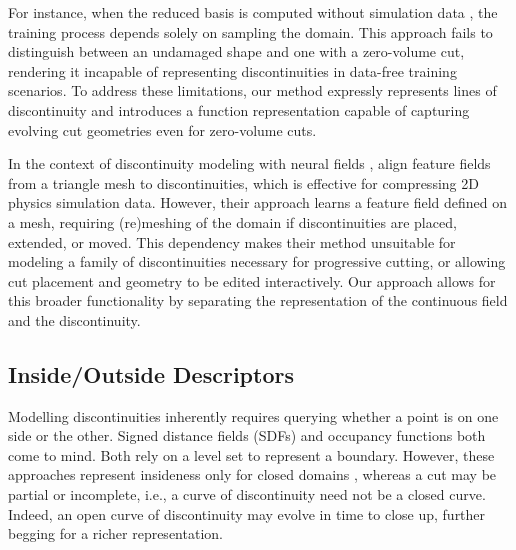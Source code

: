 For instance, when the reduced basis is computed without simulation data \citep{Modi:2024:Simplicits}, the training process depends solely on sampling the domain. This approach fails to distinguish between an undamaged shape and one with a zero-volume cut, rendering it incapable of representing discontinuities in data-free training scenarios. To address these limitations, our method expressly represents lines of discontinuity and introduces a function representation capable of capturing evolving cut geometries even for zero-volume cuts.

In the context of discontinuity modeling with neural fields \cite{liu20242d}, \citet{Belhe:2023:DiscontinuityAwareNeuralFields} align feature fields from a triangle mesh to discontinuities, which is effective for compressing 2D physics simulation data. However, their approach learns a feature field defined on a mesh, requiring (re)meshing of the domain if discontinuities are placed, extended, or moved. This dependency makes their method unsuitable for modeling a family of discontinuities necessary for progressive cutting, or allowing cut placement and geometry to be edited interactively. Our approach allows for this broader functionality by separating the representation of the continuous field and the discontinuity.

\subsection{Inside/Outside Descriptors}
Modelling discontinuities inherently requires querying whether a point is on
one side or the other. Signed distance fields (SDFs) and occupancy functions \cite{mescheder2019occupancy} both come to mind. Both rely on a level set to represent a boundary. However, these approaches represent insideness  only for closed domains , whereas a cut may be partial or incomplete, i.e., a curve of discontinuity need not be a closed curve. Indeed, an open curve of discontinuity may evolve in time to close up, further begging for a richer representation. 

